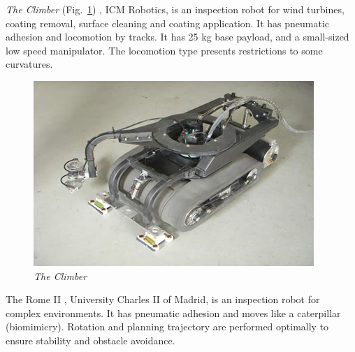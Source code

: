 \textit{The Climber} (Fig.~\ref{icm})
, ICM Robotics, is an inspection robot for
wind turbines, coating removal, surface cleaning and coating application.
It has pneumatic adhesion and locomotion by tracks. It has 25 kg base payload,
and a small-sized low speed manipulator. The locomotion type presents
restrictions to some curvatures.


\begin{figure}[ht]
	\centering
	\includegraphics[scale=0.8]{figs/climbers/icm.png}
	\caption{\textit{The Climber}}
	\label{icm}
\end{figure}

The Rome II%
, University Charles II of Madrid, is an inspection robot for complex
environments. It has pneumatic adhesion and moves like a caterpillar
(biomimicry). Rotation and planning trajectory are performed optimally to
ensure stability and obstacle avoidance.

